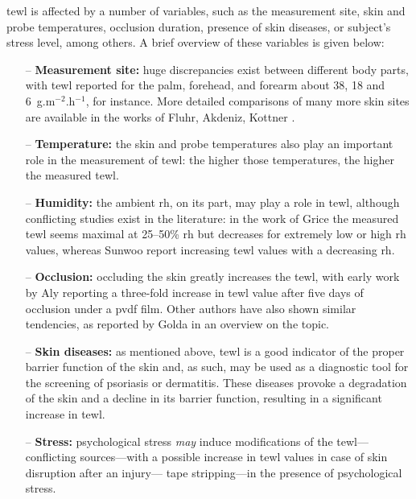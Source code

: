 \gls{tewl} is affected by a number of variables, such as the measurement site, skin and probe temperatures, occlusion duration, presence of skin diseases, or subject's stress level, among others\cite[pp.~63--76]{fluhr2004bioengineering}\cite{aly1978, rogiers2001, li2015, schmuth2020}. A brief overview of these variables is given below:

\begin{itemize}
	\item[--] \textbf{Measurement site:} huge discrepancies exist between different body parts, with \gls{tewl} reported for the palm, forehead, and forearm about 38, 18 and 6~g.m$^{-2}$.h$^{-1}$\cite{rogiers1995}, for instance. More detailed comparisons of many more skin sites are available in the works of Fluhr, Akdeniz, Kottner \etal{}\cite{fluhr2004bioengineering, kottner2013, akdeniz2018}.
	\item[--] \textbf{Temperature:} the skin and probe temperatures also play an important role in the measurement of \gls{tewl}: the higher those temperatures, the higher the measured \gls{tewl}\cite{mathias1981, rogiers1995, cravello2008}.
	\item[--] \textbf{Humidity:} the ambient \gls{rh}, on its part, may play a role in \gls{tewl}, although conflicting studies exist in the literature: in the work of Grice \etal{}\cite{grice1972} the measured \gls{tewl} seems maximal at 25--50\% \gls{rh} but decreases for extremely low or high \gls{rh} values, whereas Sunwoo \etal{}\cite{sunwoo2006} report increasing \gls{tewl} values with a decreasing \gls{rh}.
	\item[--] \textbf{Occlusion:} occluding the skin greatly increases the \gls{tewl}, with early work by Aly \etal{}\cite{aly1978} reporting a three-fold increase in \gls{tewl} value after five days of occlusion under a \gls{pvdf} film. Other authors have also shown similar tendencies, as reported by Golda \etal{}\cite{golda2005} in an overview on the topic.
	\item[--] \textbf{Skin diseases:} as mentioned above, \gls{tewl} is a good indicator of the proper barrier function of the skin and, as such, may be used as a diagnostic tool for the screening of psoriasis or dermatitis\cite{laudaska2003, montero2021}. These diseases provoke a degradation of the skin and a decline in its barrier function, resulting in a significant increase in \gls{tewl}.
	\item[--] \textbf{Stress:} psychological stress \emph{may} induce modifications of the \gls{tewl}---conflicting sources---with a possible increase in \gls{tewl} values in case of skin disruption after an injury---\ie{} tape stripping---in the presence of psychological stress\cite{altemus2001, muizzuddin2003}. %
\end{itemize}

